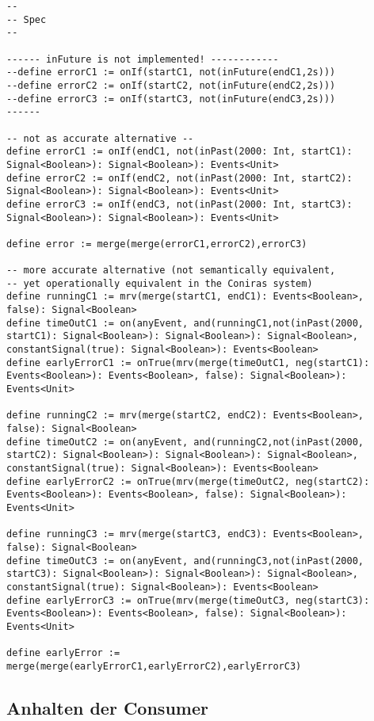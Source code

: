 \documentclass{article}
\begin{document}
\begin{lstlisting}[language=tessla+salt]
--
-- Spec
--

------ inFuture is not implemented! ------------
--define errorC1 := onIf(startC1, not(inFuture(endC1,2s)))
--define errorC2 := onIf(startC2, not(inFuture(endC2,2s)))
--define errorC3 := onIf(startC3, not(inFuture(endC3,2s)))
------

-- not as accurate alternative --
define errorC1 := onIf(endC1, not(inPast(2000: Int, startC1): Signal<Boolean>): Signal<Boolean>): Events<Unit>
define errorC2 := onIf(endC2, not(inPast(2000: Int, startC2): Signal<Boolean>): Signal<Boolean>): Events<Unit>
define errorC3 := onIf(endC3, not(inPast(2000: Int, startC3): Signal<Boolean>): Signal<Boolean>): Events<Unit>

define error := merge(merge(errorC1,errorC2),errorC3)

-- more accurate alternative (not semantically equivalent,
-- yet operationally equivalent in the Coniras system)
define runningC1 := mrv(merge(startC1, endC1): Events<Boolean>, false): Signal<Boolean>
define timeOutC1 := on(anyEvent, and(runningC1,not(inPast(2000, startC1): Signal<Boolean>): Signal<Boolean>): Signal<Boolean>, constantSignal(true): Signal<Boolean>): Events<Boolean>
define earlyErrorC1 := onTrue(mrv(merge(timeOutC1, neg(startC1): Events<Boolean>): Events<Boolean>, false): Signal<Boolean>): Events<Unit>

define runningC2 := mrv(merge(startC2, endC2): Events<Boolean>, false): Signal<Boolean>
define timeOutC2 := on(anyEvent, and(runningC2,not(inPast(2000, startC2): Signal<Boolean>): Signal<Boolean>): Signal<Boolean>, constantSignal(true): Signal<Boolean>): Events<Boolean>
define earlyErrorC2 := onTrue(mrv(merge(timeOutC2, neg(startC2): Events<Boolean>): Events<Boolean>, false): Signal<Boolean>): Events<Unit>

define runningC3 := mrv(merge(startC3, endC3): Events<Boolean>, false): Signal<Boolean>
define timeOutC3 := on(anyEvent, and(runningC3,not(inPast(2000, startC3): Signal<Boolean>): Signal<Boolean>): Signal<Boolean>, constantSignal(true): Signal<Boolean>): Events<Boolean>
define earlyErrorC3 := onTrue(mrv(merge(timeOutC3, neg(startC3): Events<Boolean>): Events<Boolean>, false): Signal<Boolean>): Events<Unit>

define earlyError := merge(merge(earlyErrorC1,earlyErrorC2),earlyErrorC3)

\end{lstlisting}

\subsection{Anhalten der Consumer}
\end{document}

